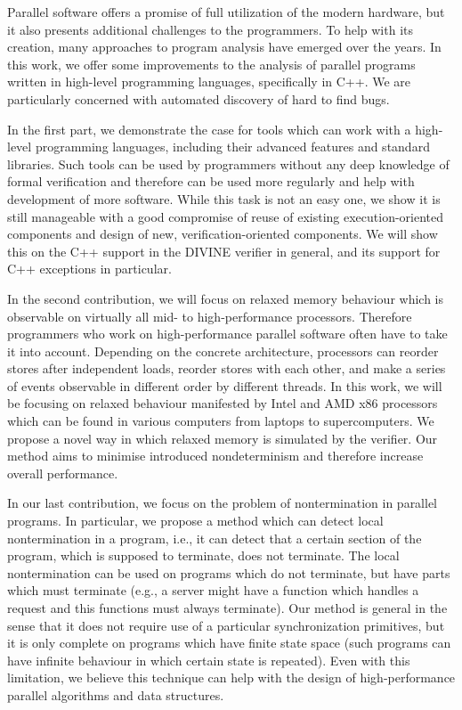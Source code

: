 Parallel software offers a promise of full utilization of the modern hardware,
but it also presents additional challenges to the programmers.
To help with its creation, many approaches to program analysis have emerged
over the years.
In this work, we offer some improvements to the analysis of parallel programs
written in high-level programming languages, specifically in C++.
We are particularly concerned with automated discovery of hard to find bugs.

In the first part, we demonstrate the case for tools which can work with a
high-level programming languages, including their advanced features and
standard libraries.
Such tools can be used by programmers without any deep knowledge of formal
verification and therefore can be used more regularly and help with development
of more software.
While this task is not an easy one, we show it is still manageable with a good
compromise of reuse of existing execution-oriented components and design of
new, verification-oriented components.
We will show this on the C++ support in the DIVINE verifier in general, and its
support for C++ exceptions in particular.

In the second contribution, we will focus on relaxed memory behaviour which is
observable on virtually all mid- to high-performance processors.
Therefore programmers who work on high-performance parallel software often have
to take it into account.
Depending on the concrete architecture, processors can reorder stores after
independent loads, reorder stores with each other, and make a series of events
observable in different order by different threads.
In this work, we will be focusing on relaxed behaviour manifested by Intel and
AMD x86 processors which can be found in various computers from laptops to
supercomputers.
We propose a novel way in which relaxed memory is simulated by the verifier.
Our method aims to minimise introduced nondeterminism and therefore increase
overall performance.

In our last contribution, we focus on the problem of nontermination in parallel
programs.
In particular, we propose a method which can detect local nontermination in a
program, i.e., it can detect that a certain section of the program, which is
supposed to terminate, does not terminate.
The local nontermination can be used on programs which do not terminate, but
have parts which must terminate (e.g., a server might have a function which
handles a request and this functions must always terminate).
Our method is general in the sense that it does not require use of a particular
synchronization primitives, but it is only complete on programs which have
finite state space (such programs can have infinite behaviour in which certain
state is repeated).
Even with this limitation, we believe this technique can help with the design
of high-performance parallel algorithms and data structures.

